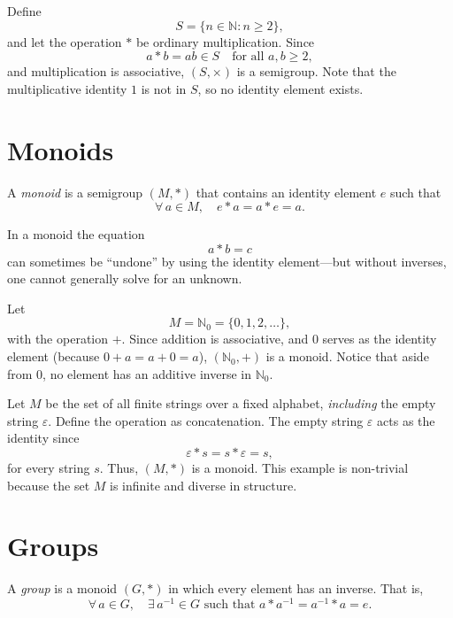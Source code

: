 \documentclass[11pt,openany]{article}
\begin{document}
\begin{example}
	Define 
	\[
	S = \{n\in \mathbb{N} : n \ge 2\},
	\]
	and let the operation \(\ast\) be ordinary multiplication. Since
	\[
	a\ast b = ab \in S \quad \text{for all } a,b \ge 2,
	\]
	and multiplication is associative, \((S, \times)\) is a semigroup. Note that the multiplicative identity \(1\) is not in \(S\), so no identity element exists.
\end{example}

\section{Monoids}
\begin{definition}[Monoid]
	A \emph{monoid} is a semigroup \((M, \ast)\) that contains an identity element \(e\) such that
	\[
	\forall\, a \in M,\quad e\ast a = a\ast e = a.
	\]
\end{definition}

In a monoid the equation
\[
a\ast b = c
\]
can sometimes be “undone” by using the identity element—but without inverses, one cannot generally solve for an unknown.

\begin{example}
	Let
	\[
	M = \mathbb{N}_0 = \{0,1,2,\dots\},
	\]
	with the operation \(+\). Since addition is associative, and \(0\) serves as the identity element (because \(0+a=a+0=a\)), \((\mathbb{N}_0, +)\) is a monoid. Notice that aside from \(0\), no element has an additive inverse in \(\mathbb{N}_0\).
\end{example}

\begin{example}
	Let \(M\) be the set of all finite strings over a fixed alphabet, \emph{including} the empty string \(\varepsilon\). Define the operation as concatenation. The empty string \(\varepsilon\) acts as the identity since
	\[
	\varepsilon \ast s = s \ast \varepsilon = s,
	\]
	for every string \(s\). Thus, \((M,\ast)\) is a monoid. This example is non-trivial because the set \(M\) is infinite and diverse in structure.
\end{example}

\section{Groups}
\begin{definition}[Group]
	A \emph{group} is a monoid \((G, \ast)\) in which every element has an inverse. That is,
	\[
	\forall\, a \in G,\quad \exists\, a^{-1} \in G \text{ such that } a\ast a^{-1} = a^{-1}\ast a = e.
	\]
\end{definition}
\end{document}
